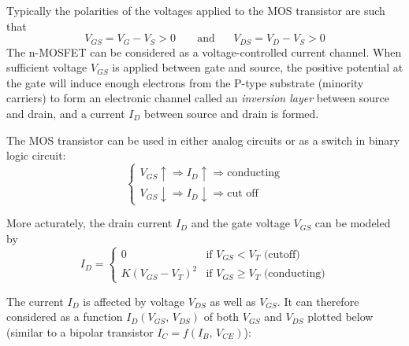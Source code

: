 \documentclass{article}
\begin{document}



Typically the polarities of the voltages applied to the MOS transistor
are such that 
\begin{equation}
V_{GS}=V_G-V_S>0 \;\;\;\;\;\;\;\mbox{and}\;\;\;\;\;\;V_{DS}=V_D-V_S>0
\end{equation}
The n-MOSFET can be considered as a voltage-controlled current channel.
When sufficient voltage $V_{GS}$ is applied between gate and source, the 
positive potential at the gate will induce enough electrons from the 
P-type substrate (minority carriers) to form an electronic channel 
called an {\em inversion layer} between source and drain, and a current 
$I_D$ between source and drain is formed. 

The MOS transistor can be used in either analog circuits or as a switch 
in binary logic circuit:
\begin{equation} 
\left\{ \begin{array}{l}
  V_{GS} \uparrow \Longrightarrow I_D \uparrow \Longrightarrow \mbox{conducting} \\
  V_{GS} \downarrow \Longrightarrow I_D \downarrow \Longrightarrow \mbox{cut off} 
\end{array} \right. 	
\end{equation}

More acturately, the drain current $I_D$ and the gate voltage $V_{GS}$ can 
be modeled by
\begin{equation} 
I_D=\left\{ \begin{array}{ll}
  0 & \mbox{if $V_{GS}<V_T$ (cutoff)} \\
  K(V_{GS}-V_T)^2 & \mbox{if $V_{GS}\ge V_T$ (conducting)}
\end{array} \right. 
\end{equation}


The current $I_D$ is affected by voltage $V_{DS}$ as well as $V_{GS}$. It can
therefore considered as a function $I_D(V_{GS},\,V_{DS})$ of both $V_{GS}$ and 
$V_{DS}$ plotted below (similar to a bipolar transistor $I_C=f(I_B,\,V_{CE})$):


\end{document}
